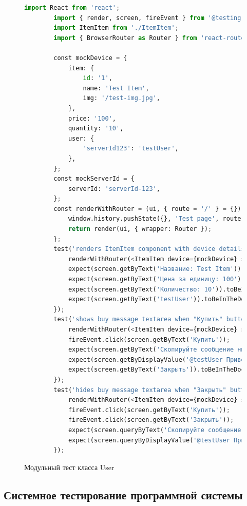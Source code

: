 \begin{figure}
	\begin{lstlisting}[language=Python]
		import React from 'react';
		import { render, screen, fireEvent } from '@testing-library/react';
		import ItemItem from './ItemItem';
		import { BrowserRouter as Router } from 'react-router-dom';
		
		const mockDevice = {
			item: {
				id: '1',
				name: 'Test Item',
				img: '/test-img.jpg',
			},
			price: '100',
			quantity: '10',
			user: {
				'serverId123': 'testUser',
			},
		};
		const mockServerId = {
			serverId: 'serverId-123',
		};
		const renderWithRouter = (ui, { route = '/' } = {}) => {
			window.history.pushState({}, 'Test page', route);
			return render(ui, { wrapper: Router });
		};
		test('renders ItemItem component with device details', () => {
			renderWithRouter(<ItemItem device={mockDevice} serverId={mockServerId} />);
			expect(screen.getByText('Название: Test Item')).toBeInTheDocument();
			expect(screen.getByText('Цена за единицу: 100')).toBeInTheDocument();
			expect(screen.getByText('Количество: 10')).toBeInTheDocument();
			expect(screen.getByText('testUser')).toBeInTheDocument();
		});
		test('shows buy message textarea when "Купить" button is clicked', () => {
			renderWithRouter(<ItemItem device={mockDevice} serverId={mockServerId} />);
			fireEvent.click(screen.getByText('Купить'));
			expect(screen.getByText('Скопируйте сообщение ниже:')).toBeInTheDocument();
			expect(screen.getByDisplayValue('@testUser Привет. Хочу купить: "Test Item" за 100 рублей (somarket)')).toBeInTheDocument();
			expect(screen.getByText('Закрыть')).toBeInTheDocument();
		});
		test('hides buy message textarea when "Закрыть" button is clicked', () => {
			renderWithRouter(<ItemItem device={mockDevice} serverId={mockServerId} />);
			fireEvent.click(screen.getByText('Купить'));
			fireEvent.click(screen.getByText('Закрыть'));
			expect(screen.queryByText('Скопируйте сообщение ниже:')).not.toBeInTheDocument();
			expect(screen.queryByDisplayValue('@testUser Привет. Хочу купить: "Test Item" за 100 рублей (somarket)')).not.toBeInTheDocument();
		});
	\end{lstlisting}  
	\caption{Модульный тест класса User}
	\label{unitUser:image}
\end{figure}

\subsection{Системное тестирование программной системы}

